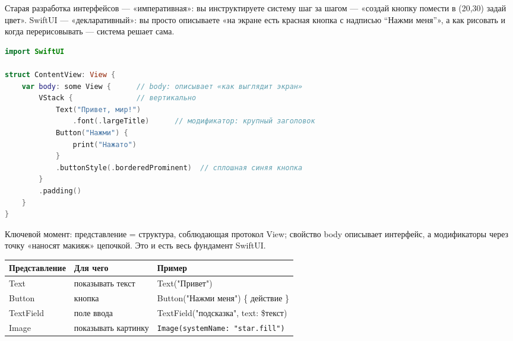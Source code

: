 


Старая разработка интерфейсов — «императивная»: вы инструктируете систему шаг за шагом — «создай кнопку помести в (20,30) задай цвет». SwiftUI — «декларативный»: вы просто описываете «на экране есть красная кнопка с надписью “Нажми меня”», а как рисовать и когда перерисовывать — система решает сама.

\begin{lstlisting}[language=Swift]
import SwiftUI

struct ContentView: View {
    var body: some View {      // body: описывает «как выглядит экран»
        VStack {               // вертикально
            Text("Привет, мир!")
                .font(.largeTitle)      // модификатор: крупный заголовок
            Button("Нажми") {
                print("Нажато")
            }
            .buttonStyle(.borderedProminent)  // сплошная синяя кнопка
        }
        .padding()
    }
}
\end{lstlisting}

Ключевой момент: представление = структура, соблюдающая протокол View; свойство body описывает интерфейс, а модификаторы через точку «наносят макияж» цепочкой. Это и есть весь фундамент SwiftUI.


\begin{center}
\begin{tabularx}{\linewidth}{|X|X|X|}
\hline
\textbf{Представление} & \textbf{Для чего} & \textbf{Пример} \tabularnewline
\hline
Text & показывать текст & Text("Привет") \tabularnewline
Button & кнопка & Button("Нажми меня") \{ действие \} \tabularnewline
TextField & поле ввода & TextField("подсказка", text: \$текст) \tabularnewline
Image & показывать картинку & \texttt{Image(systemName: "star.\allowbreak fill")} \tabularnewline
\hline
\end{tabularx}
\end{center}

